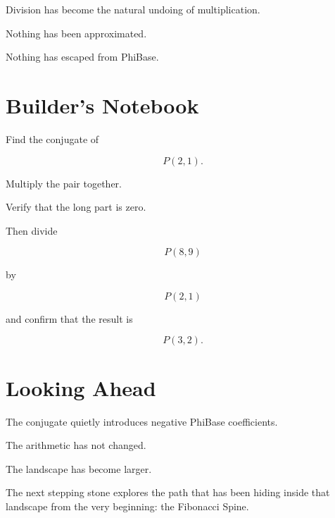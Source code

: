 Division has become the natural undoing of multiplication.

Nothing has been approximated.

Nothing has escaped from PhiBase.

\section*{Builder's Notebook}

Find the conjugate of

\[
P(2,1).
\]

Multiply the pair together.

Verify that the long part is zero.

Then divide

\[
P(8,9)
\]

by

\[
P(2,1)
\]

and confirm that the result is

\[
P(3,2).
\]

\section*{Looking Ahead}

The conjugate quietly introduces negative PhiBase coefficients.

The arithmetic has not changed.

The landscape has become larger.

The next stepping stone explores the path that has been hiding inside that landscape from the very beginning: the Fibonacci Spine.
